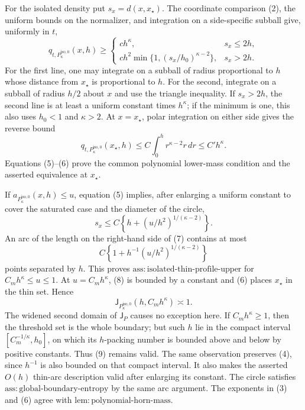 For the isolated density put \(s_x=d(x,x_{\star})\).  The coordinate
comparison (2), the uniform bounds on the normalizer, and integration on
a side-specific subball give, uniformly in \(t\),
\[
 q_{t,P_{\kappa}^{\mathrm{iso},0}}(x,h)\ge
 \begin{cases}
 c h^{\kappa},&s_x\le2h,\\
 c h^2\min\{1,(s_x/h_0)^{\kappa-2}\},&s_x>2h.
 \end{cases}
 \tag{5}
\]
For the first line, one may integrate on a subball of radius proportional
to \(h\) whose distance from \(x_{\star}\) is proportional to \(h\).
For the second, integrate on a subball of radius \(h/2\) about \(x\) and
use the triangle inequality.  If \(s_x>2h\), the second line is at least
a uniform constant times \(h^{\kappa}\); if the minimum is one, this also
uses \(h_0<1\) and \(\kappa>2\).  At \(x=x_{\star}\), polar integration
on either side gives the reverse bound
\[
 q_{t,P_{\kappa}^{\mathrm{iso},0}}(x_{\star},h)
 \le C\int_0^h r^{\kappa-2}r\,dr
 \le C'h^{\kappa}.
 \tag{6}
\]
Equations (5)--(6) prove the common polynomial lower-mass condition and
the asserted equivalence at \(x_{\star}\).

If \(a_{P_{\kappa}^{\mathrm{iso},0}}(x,h)\le u\), equation (5) implies,
after enlarging a uniform constant to cover the saturated case and the
diameter of the circle,
\[
 s_x\le C\left\{h+(u/h^2)^{1/(\kappa-2)}\right\}.
 \tag{7}
\]
An arc of the length on the right-hand side of (7) contains at most
\[
 C\left\{1+h^{-1}(u/h^2)^{1/(\kappa-2)}\right\}
 \tag{8}
\]
points separated by \(h\).  This proves
\(\mathrm{ass:isolated\text{-}thin\text{-}profile\text{-}upper}\) for
\(C_mh^{\kappa}\le u\le1\).  At \(u=C_mh^{\kappa}\), (8) is bounded by
a constant and (6) places \(x_{\star}\) in the thin set.  Hence
\[
 \mathsf J_{P_{\kappa}^{\mathrm{iso},0}}
       (h,C_mh^{\kappa})\asymp1.
 \tag{9}
\]
The widened second domain of \(\mathsf J_P\) causes no exception here.
If \(C_mh^{\kappa}\ge1\), then the threshold set is the whole boundary;
but such \(h\) lie in the compact interval
\([C_m^{-1/\kappa},h_0]\), on which its \(h\)-packing number is bounded
above and below by positive constants.  Thus (9) remains valid.  The
same observation preserves (4), since \(h^{-1}\) is also bounded on that
compact interval.  It also makes the asserted \(O(h)\) thin-arc
description valid after enlarging its constant.  The circle satisfies
\(\mathrm{ass:global\text{-}boundary\text{-}entropy}\) by the same arc
argument.  The exponents in (3) and (6) agree with
\(\mathrm{lem:polynomial\text{-}horn\text{-}mass}\).

